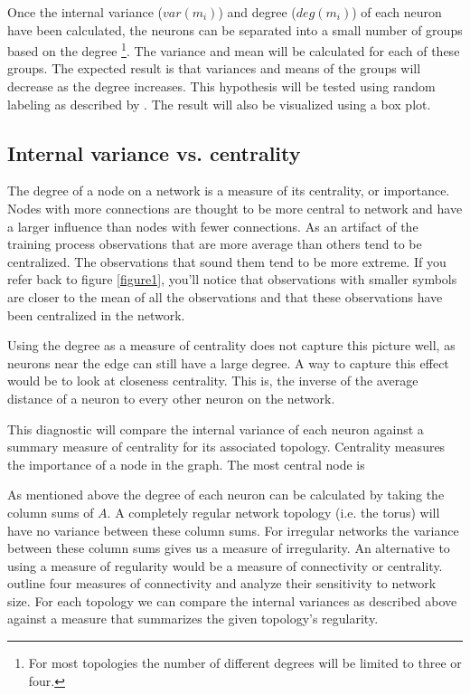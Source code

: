 Once the internal variance ($var(m_i)$) and degree ($deg(m_i)$) of each neuron
have been calculated, the neurons can be separated into a small number of
groups based on the degree \footnote{For most topologies the number of
different degrees will be limited to three or four.}.  The variance and mean
will be calculated for each of these groups.  The expected result is that
variances and means of the groups will decrease as the degree increases.  This
hypothesis will be tested using random labeling as described by \cite{siss2004}.
The result will also be visualized using a box plot.

\subsection{Internal variance vs. centrality}
The degree of a node on a network is a measure of its centrality, or
importance. Nodes with more connections are thought to be more central to
network and have a larger influence than nodes with fewer connections. As an
artifact of the training process observations that are more average than
others tend to be centralized.  The observations that sound them tend to be
more extreme.  If you refer back to figure \ref{figure1}, you'll notice that
observations with smaller symbols are closer to the mean of all the
observations and that these observations have been centralized in the network.

Using the degree as a measure of centrality does not capture this picture
well, as neurons near the edge can still have a large degree.  A way to
capture this effect would be to look at closeness centrality.  This is, the
inverse of the average distance of a neuron to every other neuron on the
network.


This diagnostic will compare the internal variance of each neuron against a
summary measure of centrality for its associated topology. Centrality measures
the importance of a node in the graph.  The most central node is 

As mentioned above the
degree of each neuron can be calculated by taking the column sums of $A$.  A
completely regular network topology (i.e. the torus) will have no variance
between these column sums.  For irregular networks the variance between these
column sums gives us a measure of irregularity.  An alternative to using a
measure of regularity would be a measure of connectivity or centrality.  
\cite{florax95} outline four measures of connectivity and analyze their
sensitivity to network size.
For each topology we can compare the internal variances as described above
against a measure that summarizes the given topology's regularity.


